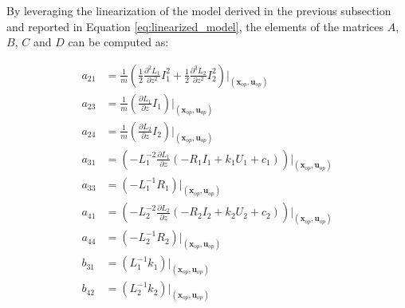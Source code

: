 By leveraging the linearization of the model derived in the previous subsection and reported in Equation \ref{eq:linearized_model}, the elements of the matrices $A$, $B$, $C$ and $D$ can be computed as:

\begin{equation}
    \begin{aligned}
        a_{21} & = \frac{1}{m} \left( \frac{1}{2} \frac{\partial^2 L_1}{\partial z^2} I_1^2 + \frac{1}{2} \frac{\partial^2 L_2}{\partial z^2} I_{2}^2 \right) \bigg|_{(\mathbf{x}_{op}, \mathbf{u}_{op})} \\
        a_{23} & = \frac{1}{m} \left( \frac{\partial L_1}{\partial z} I_1\right) \bigg|_{(\mathbf{x}_{op}, \mathbf{u}_{op})}                                                                              \\
        a_{24} & = \frac{1}{m} \left( \frac{\partial L_2}{\partial z} I_2\right) \bigg|_{(\mathbf{x}_{op}, \mathbf{u}_{op})}                                                                              \\
        a_{31} & = \left(- L_1^{-2} \frac{\partial L_1}{\partial z} \left(- R_1 I_1 + k_1 U_1 + c_1 \right) \right) \bigg|_{(\mathbf{x}_{op}, \mathbf{u}_{op})}                                           \\
        a_{33} & = \left(- L_1^{-1} R_1 \right) \big|_{(\mathbf{x}_{op}, \mathbf{u}_{op})}                                                                                                                \\
        a_{41} & = \left(- L_2^{-2} \frac{\partial L_2}{\partial z} \left(- R_2 I_2 + k_2 U_2 + c_2 \right) \right) \bigg|_{(\mathbf{x}_{op}, \mathbf{u}_{op})}                                           \\
        a_{44} & = \left(- L_2^{-1} R_2 \right) \big|_{(\mathbf{x}_{op}, \mathbf{u}_{op})}                                                                                                                \\
        b_{31} & = \left(L_1^{-1} k_1 \right) \big|_{(\mathbf{x}_{op}, \mathbf{u}_{op})}                                                                                                                  \\
        b_{42} & = \left(L_2^{-1} k_2 \right) \big|_{(\mathbf{x}_{op}, \mathbf{u}_{op})}
    \end{aligned}
\end{equation}


